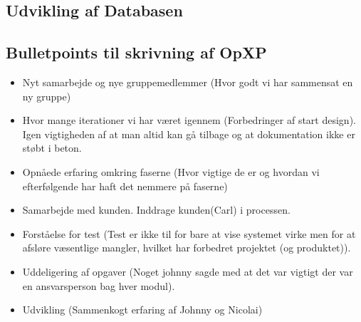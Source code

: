 \subsection{Udvikling af Databasen}

\subsection{Bulletpoints til skrivning af OpXP}
\begin{itemize}
\item Nyt samarbejde og nye gruppemedlemmer (Hvor godt vi har sammensat en ny gruppe)
\item Hvor mange iterationer vi har været igennem (Forbedringer af start design). Igen vigtigheden af at man altid kan gå tilbage og at dokumentation ikke er støbt i beton.
\item Opnåede erfaring omkring faserne (Hvor vigtige de er og hvordan vi efterfølgende har haft det nemmere på faserne)
\item Samarbejde med kunden. Inddrage kunden(Carl) i processen.
\item Forståelse for test (Test er ikke til for bare at vise systemet virke men for at afsløre væsentlige mangler, hvilket har forbedret projektet (og produktet)).
\item Uddeligering af opgaver (Noget johnny sagde med at det var vigtigt der var en ansvarsperson bag hver modul).
\item Udvikling (Sammenkogt erfaring af Johnny og Nicolai)
\end{itemize}